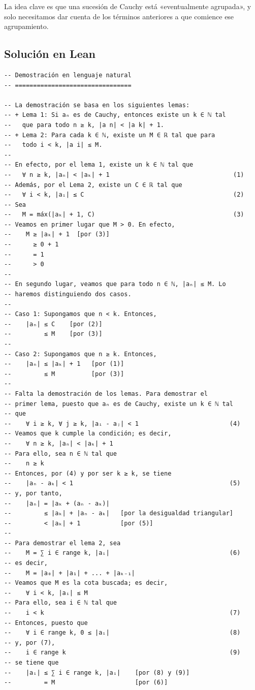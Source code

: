 La idea clave es que una sucesión de Cauchy está «eventualmente agrupada», y solo necesitamos dar cuenta de los términos anteriores a que comience ese agrupamiento.

\subsection{Solución en Lean}

\begin{verbatim}
-- Demostración en lenguaje natural
-- ================================

-- La demostración se basa en los siguientes lemas:
-- + Lema 1: Si aₙ es de Cauchy, entonces existe un k ∈ ℕ tal
--   que para todo n ≥ k, |a n| < |a k| + 1.
-- + Lema 2: Para cada k ∈ ℕ, existe un M ∈ ℝ tal que para
--   todo i < k, |a i| ≤ M.
--
-- En efecto, por el lema 1, existe un k ∈ ℕ tal que
--   ∀ n ≥ k, |aₙ| < |aₖ| + 1                                  (1)
-- Además, por el Lema 2, existe un C ∈ ℝ tal que
--   ∀ i < k, |aᵢ| ≤ C                                         (2)
-- Sea
--   M = máx(|aₖ| + 1, C)                                      (3)
-- Veamos en primer lugar que M > 0. En efecto,
--    M ≥ |aₖ| + 1  [por (3)]
--      ≥ 0 + 1
--      = 1
--      > 0
--
-- En segundo lugar, veamos que para todo n ∈ ℕ, |aₙ| ≤ M. Lo
-- haremos distinguiendo dos casos.
--
-- Caso 1: Supongamos que n < k. Entonces,
--    |aₙ| ≤ C    [por (2)]
--         ≤ M    [por (3)]
--
-- Caso 2: Supongamos que n ≥ k. Entonces,
--    |aₙ| ≤ |aₖ| + 1   [por (1)]
--         ≤ M          [por (3)]
--
-- Falta la demostración de los lemas. Para demostrar el
-- primer lema, puesto que aₙ es de Cauchy, existe un k ∈ ℕ tal
-- que
--    ∀ i ≥ k, ∀ j ≥ k, |aᵢ - aⱼ| < 1                         (4)
-- Veamos que k cumple la condición; es decir,
--    ∀ n ≥ k, |aₙ| < |aₖ| + 1
-- Para ello, sea n ∈ ℕ tal que
--    n ≥ k
-- Entonces, por (4) y por ser k ≥ k, se tiene
--    |aₙ - aₖ| < 1                                           (5)
-- y, por tanto,
--    |aₙ| = |aₖ + (aₙ - aₖ)|
--         ≤ |aₖ| + |aₙ - aₖ|   [por la desigualdad triangular]
--         < |aₖ| + 1           [por (5)]
--
-- Para demostrar el lema 2, sea
--    M = ∑ i ∈ range k, |aᵢ|                                 (6)
-- es decir,
--    M = |a₀| + |a₁| + ... + |aₖ₋₁|
-- Veamos que M es la cota buscada; es decir,
--    ∀ i < k, |aᵢ| ≤ M
-- Para ello, sea i ∈ ℕ tal que
--    i < k                                                   (7)
-- Entonces, puesto que
--    ∀ i ∈ range k, 0 ≤ |aᵢ|                                 (8)
-- y, por (7),
--    i ∈ range k                                             (9)
-- se tiene que
--    |aᵢ| ≤ ∑ i ∈ range k, |aᵢ|    [por (8) y (9)]
--         = M                      [por (6)]


\end{verbatim}
